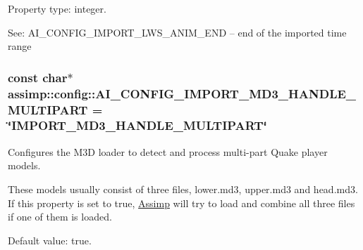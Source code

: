 Property type\+: integer.

See\+: {\ttfamily A\+I\+\_\+\+C\+O\+N\+F\+I\+G\+\_\+\+I\+M\+P\+O\+R\+T\+\_\+\+L\+W\+S\+\_\+\+A\+N\+I\+M\+\_\+\+E\+N\+D} – end of the imported time range \hypertarget{namespaceassimp_1_1config_acc3402a97b8c02e2c656e0a50b2dc997}{
\subsubsection[{A\+I\+\_\+\+C\+O\+N\+F\+I\+G\+\_\+\+I\+M\+P\+O\+R\+T\+\_\+\+M\+D3\+\_\+\+H\+A\+N\+D\+L\+E\+\_\+\+M\+U\+L\+T\+I\+P\+A\+R\+T}]{\setlength{\rightskip}{0pt plus 5cm}const char$\ast$ assimp\+::config\+::\+A\+I\+\_\+\+C\+O\+N\+F\+I\+G\+\_\+\+I\+M\+P\+O\+R\+T\+\_\+\+M\+D3\+\_\+\+H\+A\+N\+D\+L\+E\+\_\+\+M\+U\+L\+T\+I\+P\+A\+R\+T = \char`\"{}I\+M\+P\+O\+R\+T\+\_\+\+M\+D3\+\_\+\+H\+A\+N\+D\+L\+E\+\_\+\+M\+U\+L\+T\+I\+P\+A\+R\+T\char`\"{}}}\label{namespaceassimp_1_1config_acc3402a97b8c02e2c656e0a50b2dc997}
Configures the M3\+D loader to detect and process multi-\/part Quake player models.

These models usually consist of three files, {\ttfamily lower.\+md3}, {\ttfamily upper.\+md3} and {\ttfamily head.\+md3}. If this property is set to true, \hyperlink{class_assimp}{Assimp} will try to load and combine all three files if one of them is loaded.

Default value\+: true.

